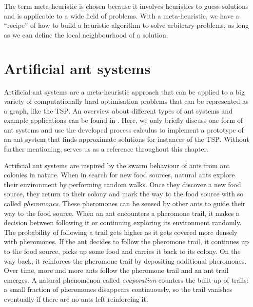 The term meta-heuristic is chosen because it involves heuristics to guess solutions and is applicable to a wide field of problems. With a meta-heuristic, we have a \enquote{recipe} of how to build a heuristic algorithm to solve arbitrary problems, as long as we can define the local neighbourhood of a solution.

\section{Artificial ant systems}
\label{chp:ant_system}
Artificial ant systems are a meta-heuristic approach that can be applied to a big variety of computationally hard optimisation problems that can be represented as a graph, like the \textsc{TSP}. An overview about different types of ant systems and example applications can be found in \cite{Dorigo:2004:ACO:975277}. Here, we only briefly discuss one form of ant systems and use the developed process calculus to implement a prototype of an ant system that finds approximate solutions for instances of the \textsc{TSP}. Without further mentioning, \cite{Dorigo:2004:ACO:975277} serves us as a reference throughout this chapter.

Artificial ant systems are inspired by the swarm behaviour of ants from ant colonies in nature. When in search for new food sources, natural ants explore their environment by performing random walks. Once they discover a new food source, they return to their colony and mark the way to the food source with so called \textit{pheromones}. These pheromones can be sensed by other ants to guide their way to the food source. When an ant encounters a pheromone trail, it makes a decision between following it or continuing exploring its environment randomly. The probability of following a trail gets higher as it gets covered more densely with pheromones. If the ant decides to follow the pheromone trail, it continues up to the food source, picks up some food and carries it back to its colony. On the way back, it reinforces the pheromone trail by depositing additional pheromones. Over time, more and more ants follow the pheromone trail and an ant trail emerges. A natural phenomenon called \textit{evaporation} counters the built-up of trails: a small fraction of pheromones disappears continuously, so the trail vanishes eventually if there are no ants left reinforcing it.

